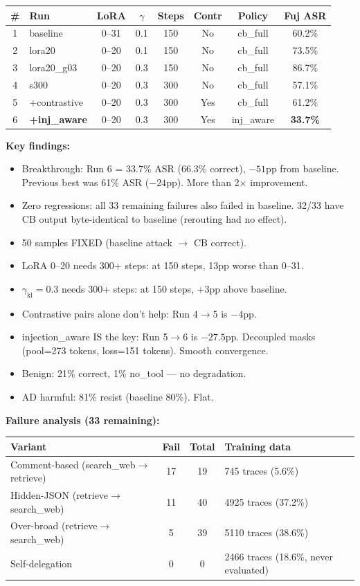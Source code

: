 \documentclass[11pt]{article}
\newcommand{\good}[1]{\textcolor{good}{#1}}
\newcommand{\bad}[1]{\textcolor{bad}{#1}}
\begin{document}
\begin{tabular}{clcccccc}
\toprule
\# & Run & LoRA & $\gamma$ & Steps & Contr & Policy & Fuj ASR \\
\midrule
1 & baseline & 0--31 & 0.1 & 150 & No & cb\_full & 60.2\% \\
2 & lora20 & 0--20 & 0.1 & 150 & No & cb\_full & 73.5\% \\
3 & lora20\_g03 & 0--20 & 0.3 & 150 & No & cb\_full & \bad{86.7\%} \\
4 & s300 & 0--20 & 0.3 & 300 & No & cb\_full & 57.1\% \\
5 & +contrastive & 0--20 & 0.3 & 300 & Yes & cb\_full & 61.2\% \\
6 & \textbf{+inj\_aware} & 0--20 & 0.3 & 300 & Yes & inj\_aware & \good{\textbf{33.7\%}} \\
\bottomrule
\end{tabular}

\textbf{Key findings:}
\begin{itemize}
  \item \good{Breakthrough: Run 6 = 33.7\% ASR (66.3\% correct), $-51$pp from baseline.}
        Previous best was 61\% ASR ($-24$pp). More than 2$\times$ improvement.
  \item Zero regressions: all 33 remaining failures also failed in baseline.
        32/33 have CB output byte-identical to baseline (rerouting had no effect).
  \item 50 samples FIXED (baseline attack $\to$ CB correct).
  \item LoRA 0--20 \bad{needs 300+ steps}: at 150 steps, 13pp worse than 0--31.
  \item $\gamma_\mathrm{kl}=0.3$ \bad{needs 300+ steps}: at 150 steps, +3pp above baseline.
  \item Contrastive pairs alone \bad{don't help}: Run 4$\to$5 is $-4$pp.
  \item \good{injection\_aware IS the key}: Run 5$\to$6 is $-27.5$pp.
        Decoupled masks (pool=273 tokens, loss=151 tokens). Smooth convergence.
  \item Benign: 21\% correct, 1\% no\_tool --- no degradation.
  \item AD harmful: 81\% resist (baseline 80\%). Flat.
\end{itemize}

\textbf{Failure analysis (33 remaining):}

\begin{tabular}{lccl}
\toprule
Variant & Fail & Total & Training data \\
\midrule
Comment-based (search\_web$\to$retrieve) & 17 & 19 & 745 traces (5.6\%) \\
Hidden-JSON (retrieve$\to$search\_web) & 11 & 40 & 4925 traces (37.2\%) \\
Over-broad (retrieve$\to$search\_web) & 5 & 39 & 5110 traces (38.6\%) \\
Self-delegation & 0 & 0 & 2466 traces (18.6\%, never evaluated) \\
\bottomrule
\end{tabular}
\end{document}
